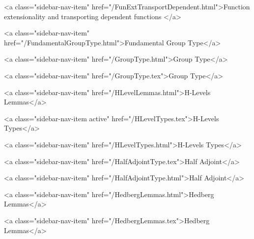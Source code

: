           <a class="sidebar-nav-item" href="/FunExtTransportDependent.html">Function extensionality and transporting dependent functions </a>
        
      
    
      
        
          <a class="sidebar-nav-item" href="/FundamentalGroupType.html">Fundamental Group Type</a>
        
      
    
      
        
          <a class="sidebar-nav-item" href="/GroupType.html">Group Type</a>
        
      
    
      
        
          <a class="sidebar-nav-item" href="/GroupType.tex">Group Type</a>
        
      
    
      
        
          <a class="sidebar-nav-item" href="/HLevelLemmas.html">H-Levels Lemmas</a>
        
      
    
      
        
          <a class="sidebar-nav-item active" href="/HLevelTypes.tex">H-Levels Types</a>
        
      
    
      
        
          <a class="sidebar-nav-item" href="/HLevelTypes.html">H-Levels Types</a>
        
      
    
      
        
          <a class="sidebar-nav-item" href="/HalfAdjointType.tex">Half Adjoint</a>
        
      
    
      
        
          <a class="sidebar-nav-item" href="/HalfAdjointType.html">Half Adjoint</a>
        
      
    
      
        
          <a class="sidebar-nav-item" href="/HedbergLemmas.html">Hedberg Lemmas</a>
        
      
    
      
        
          <a class="sidebar-nav-item" href="/HedbergLemmas.tex">Hedberg Lemmas</a>
        
      
    
